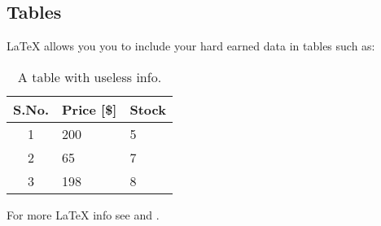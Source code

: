 \documentclass[a4paper,12pt]{article}
\begin{document}
\subsection{Tables}
\LaTeX{} allows you you to include your hard earned data in tables such as:

\begin{table}[htb]
\caption{A table with useless info.}
\label{tab:tab1}
\centering
	\begin{tabular}{c|l|l}
	S.No. & Price [\$] & Stock \\ 	
	\hline
	\hline
	1 & 200 & 5 \\
	2 & 65 & 7 \\
	3 & 198 & 8 \\
	\end{tabular}
\end{table}

For more \LaTeX{} info see\cite{goossens93} and \cite{greenwade93}.


\end{document}
